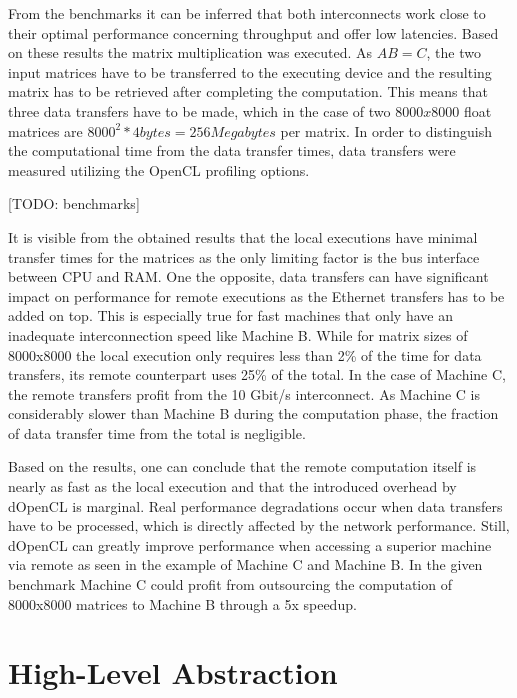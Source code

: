 From the benchmarks it can be inferred that both interconnects work close to their optimal performance concerning throughput and offer low latencies. Based on these results the matrix multiplication was executed. As $AB = C$, the two input matrices have to be transferred to the executing device and the resulting matrix has to be retrieved after completing the computation. This means that three data transfers have to be made, which in the case of two $8000x8000$ float matrices are $8000^2 * 4 bytes = 256 Megabytes$ per matrix. In order to distinguish the computational time from the data transfer times, data transfers were measured utilizing the OpenCL profiling options.

[TODO: benchmarks]

It is visible from the obtained results that the local executions have minimal transfer times for the matrices as the only limiting factor is the bus interface between CPU and RAM. One the opposite, data transfers can have significant impact on performance for remote executions as the Ethernet transfers has to be added on top. This is especially true for fast machines that only have an inadequate interconnection speed like Machine B. While for matrix sizes of 8000x8000 the local execution only requires less than 2\% of the time for data transfers, its remote counterpart uses 25\% of the total. In the case of Machine C, the remote transfers profit from the 10 Gbit/s interconnect. As Machine C is considerably slower than Machine B during the computation phase, the fraction of data transfer time from the total is negligible.

Based on the results, one can conclude that the remote computation itself is nearly as fast as the local execution and that the introduced overhead by dOpenCL is marginal. Real performance degradations occur when data transfers have to be processed, which is directly affected by the network performance. Still, dOpenCL can greatly improve performance when accessing a superior machine via remote as seen in the example of Machine C and Machine B. In the given benchmark Machine C could profit from outsourcing the computation of 8000x8000 matrices to Machine B through a 5x speedup.

\section{High-Level Abstraction}
\label{abstraction}

